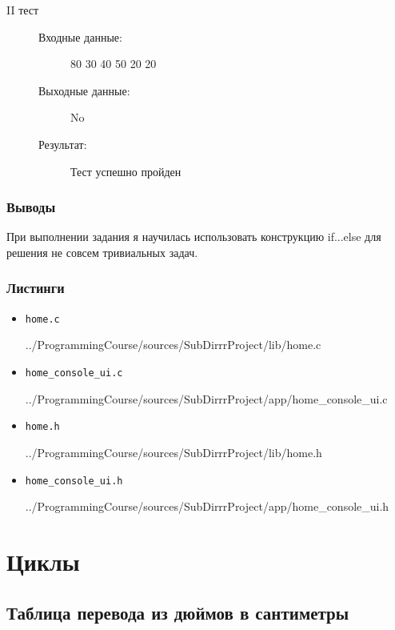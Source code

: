 \documentclass[12pt,a4paper]{report}
\begin{document}
\begin{enumerate}
\begin{description}
\item[II тест]
\hspace{\parindent}
\begin{flushleft}
\begin{description}
\item[Входные данные:] 80 30 40 50 20 20 
\item[Выходные данные:] No
\item[Результат:] Тест успешно пройден
\end{description}
\end{flushleft}
\end{description}

\end{enumerate}

\subsection{Выводы}
\hspace{\parindent} 
При выполнении задания я научилась использовать конструкцию if...else для решения не совсем тривиальных задач.
\subsection*{Листинги}
\begin{itemize}
\item[] \verb-home.c-

{../ProgrammingCourse/sources/SubDirrrProject/lib/home.c}
\item[] \verb-home_console_ui.c-

{../ProgrammingCourse/sources/SubDirrrProject/app/home_console_ui.c}
\item[] \verb-home.h-

{../ProgrammingCourse/sources/SubDirrrProject/lib/home.h}
\item[] \verb-home_console_ui.h-

{../ProgrammingCourse/sources/SubDirrrProject/app/home_console_ui.h}
\end{itemize}
%
\chapter{Циклы}
\section{Таблица перевода из дюймов в сантиметры}
\end{document}
